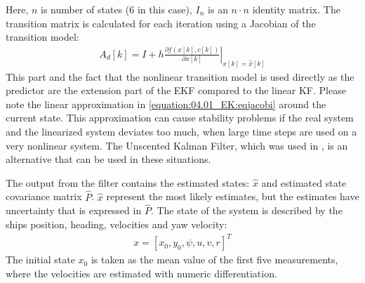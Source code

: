 
Here, \(n\) is number of states (6 in this case), \(I_n\) is an \(n \cdot n\) identity matrix.
The transition matrix is calculated for each iteration using a Jacobian of the transition model:
\begin{equation}\label{equation:04.01_EK:eqjacobi}
\begin{split}A_d[k] = I + h \left. \frac{\partial f \left(x[k],c[k] \right)}{\partial x[k]} \right|_{x[k]=\hat{x}[k]}\end{split}
\end{equation}
\sphinxAtStartPar
This part and the fact that the nonlinear transition model is used directly as the predictor are the extension part of the EKF compared to the linear KF. Please note the linear approximation in \autoref{equation:04.01_EK:eqjacobi} around the current state. This approximation can cause stability problems if the real system and the linearized system deviates too much, when large time steps are used on a very nonlinear system. The Unscented Kalman Filter, which was used in \textcite{revestido_herrero_two-step_2012}, is an alternative that can be used in these situations.

\sphinxAtStartPar
The output from the filter contains the estimated states: \(\hat{x}\) and estimated state covariance matrix \(\hat{P}\). \(\hat{x}\) represent the most likely estimates, but the estimates have uncertainty that is expressed in \(\hat{P}\).
The state of the system is described by the ships position, heading, velocities and yaw velocity:
\begin{equation}\label{equation:04.01_EK:eqstates}
\begin{split}x = [x_0,y_0,\psi,u,v,r]^T\end{split}
\end{equation}
\sphinxAtStartPar
The initial state \(x_0\) is taken as the mean value of the first five measurements, where the velocities are estimated with numeric differentiation.

